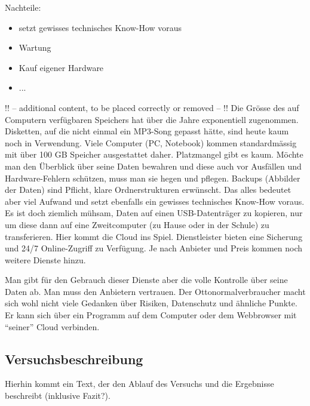 Nachteile:
\begin{itemize}
\item setzt gewisses technisches Know-How voraus
\item Wartung
\item Kauf eigener Hardware
\item ... 
\end{itemize}

!! -- additional content, to be placed correctly or removed -- !!
Die Grösse des auf Computern verfügbaren Speichers hat über die Jahre exponentiell zugenommen. Disketten, auf die nicht einmal ein MP3-Song gepasst hätte, sind heute kaum noch in Verwendung. Viele Computer (PC, Notebook) kommen standardmässig mit über 100 GB Speicher ausgestattet daher. Platzmangel gibt es kaum. Möchte man den Überblick über seine Daten bewahren und diese auch vor Ausfällen und Hardware-Fehlern schützen, muss man sie hegen und pflegen. Backups (Abbilder der Daten) sind Pflicht, klare Ordnerstrukturen erwünscht. Das alles bedeutet aber viel Aufwand und setzt ebenfalls ein gewisses technisches Know-How voraus. Es ist doch ziemlich mühsam, Daten auf einen USB-Datenträger zu kopieren, nur um diese dann auf eine Zweitcomputer (zu Hause oder in der Schule) zu transferieren. Hier kommt die Cloud ins Spiel. Dienstleister bieten eine Sicherung und 24/7 Online-Zugriff zu Verfügung. Je nach Anbieter und Preis kommen noch weitere Dienste hinzu. 

Man gibt für den Gebrauch dieser Dienste aber die volle Kontrolle über seine Daten ab. Man muss den Anbietern vertrauen. Der Ottonormalverbraucher macht sich wohl nicht viele Gedanken über Risiken, Datenschutz und ähnliche Punkte. Er kann sich über ein Programm auf dem Computer oder dem Webbrowser mit ``seiner'' Cloud verbinden.

\subsection{Versuchsbeschreibung}
Hierhin kommt ein Text, der den Ablauf des Versuchs und die Ergebnisse beschreibt (inklusive Fazit?).


